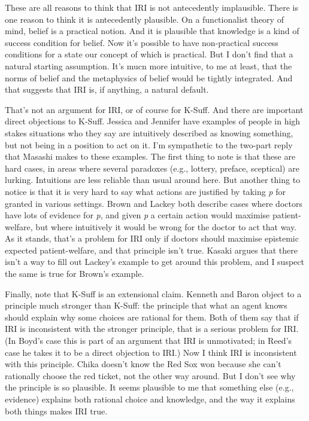 \documentclass[11pt,oneside]{book}
\begin{document}
These are all reasons to think that IRI is not antecedently implausible. There is one reason to think it is antecedently plausible. On a functionalist theory of mind, belief is a practical notion. And it is plausible that knowledge is a kind of success condition for belief. Now it's possible to have non-practical success conditions for a state our concept of which is practical. But I don't find that a natural starting assumption. It's mucn more intuitive, to me at least, that the norms of belief and the metaphysics of belief would be tightly integrated. And that suggests that IRI is, if anything, a natural default.

That's not an argument for IRI, or of course for K-Suff. And there are important direct objections to K-Suff. Jessica  \citet{Brown2008} and Jennifer  \citet{Lackey2010} have examples of people in high stakes situations who they say are intuitively described as knowing something, but not being in a position to act on it. I'm sympathetic to the two-part reply that Masashi  \citet{Kasaki2014} makes to these examples. The first thing to note is that these are hard cases, in areas where several paradoxes (e.g., lottery, preface, sceptical) are lurking. Intuitions are less reliable than usual around here. But another thing to notice is that it is very hard to say what actions are justified by taking \emph{p} for granted in various settings. Brown and Lackey both describe cases where doctors have lots of evidence for \emph{p}, and given \emph{p} a certain action would maximise patient-welfare, but where intuitively it would be wrong for the doctor to act that way. As it stands, that's a problem for IRI only if doctors should maximise epistemic expected patient-welfare, and that principle isn't true. Kasaki argues that there isn't a way to fill out Lackey's example to get around this problem, and I suspect the same is true for Brown's example.

Finally, note that K-Suff is an extensional claim. Kenneth  \citet{Boyd2015} and Baron  \citet{Reed2014} object to a principle much stronger than K-Suff: the principle that what an agent knows should explain why some choices are rational for them. Both of them say that if IRI is inconsistent with the stronger principle, that is a serious problem for IRI. (In Boyd's case this is part of an argument that IRI is unmotivated; in Reed's case he takes it to be a direct objection to IRI.) Now I think IRI is inconsistent with this principle. Chika doesn't know the Red Sox won because she can't rationally choose the red ticket, not the other way around. But I don't see why the principle is so plausible. It seems plausible to me that something else (e.g., evidence) explains both rational choice and knowledge, and the way it explains both things makes IRI true.
\end{document}
